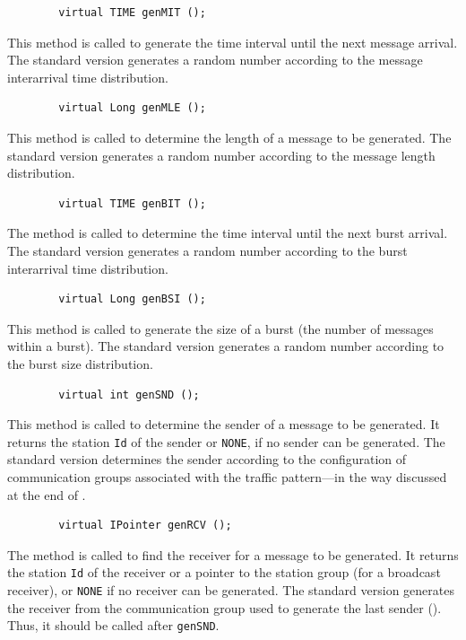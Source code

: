 \begin{verbatim}
        virtual TIME genMIT ();
\end{verbatim}
\noindent
This method is called to generate the time interval until the next message
arrival.
The standard version generates a random number according to the
message interarrival time distribution.

\begin{verbatim}
        virtual Long genMLE ();
\end{verbatim}
\noindent
This method is called to determine the length of a message to be generated.
The standard version generates a random number according to the message length
distribution.

\begin{verbatim}
        virtual TIME genBIT ();
\end{verbatim}
\noindent
The method is called to determine the time interval until
the next burst arrival.
The standard version generates a random number according to the burst
interarrival time distribution.

\begin{verbatim}
        virtual Long genBSI ();
\end{verbatim}
\noindent
This method is called to generate the size of a burst (the number of messages
within a burst).
The standard version generates a random number according to the burst size
distribution.

\begin{verbatim}
        virtual int genSND ();
\end{verbatim}
\noindent
This method is called to determine the sender of a message to be generated.
It returns the station {\tt Id} of the sender or {\tt NONE}, if no sender
can be generated.
The standard version determines the sender according to the configuration
of communication groups associated with the traffic pattern---in the way
discussed at the end of .

\begin{verbatim}
        virtual IPointer genRCV ();
\end{verbatim}
\noindent
The method is called to find the receiver for a message to be generated.
It returns the station {\tt Id} of the receiver or a pointer to the
station group (for a broadcast receiver), or {\tt NONE} if no receiver
can be generated.
The standard version generates the receiver from the communication
group used to generate the last sender ().
Thus, it should be called after {\tt genSND}.

